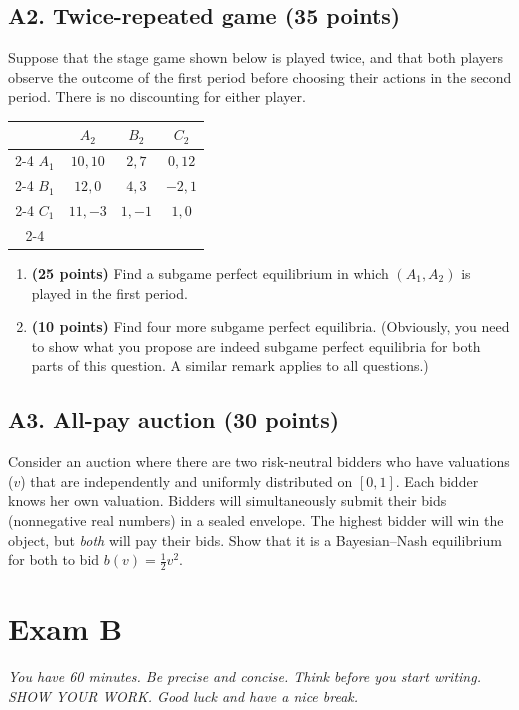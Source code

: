 \documentclass[11pt]{article}
\newcommand{\pts}[1]{\textbf{(#1 points)}}
\begin{document}
\subsection*{A2. Twice-repeated game \pts{35}}
Suppose that the stage game shown below is played twice, and that both players observe the outcome of the first period before choosing their actions in the second period. There is no discounting for either player.
\begin{center}
\begin{tabular}{c|c|c|c|}
  \multicolumn{1}{c}{} & \multicolumn{1}{c}{$A_2$} & \multicolumn{1}{c}{$B_2$} & \multicolumn{1}{c}{$C_2$} \\ \cline{2-4}
  $A_1$ & $10,10$ & $2,7$  & $0,12$ \\ \cline{2-4}
  $B_1$ & $12,0$  & $4,3$  & $-2,1$ \\ \cline{2-4}
  $C_1$ & $11,-3$ & $1,-1$ & $1,0$  \\ \cline{2-4}
\end{tabular}
\end{center}
\begin{enumerate}
  \item[(a)] \pts{25} Find a subgame perfect equilibrium in which $(A_1,A_2)$ is played in the first period.
  \item[(b)] \pts{10} Find four more subgame perfect equilibria. (Obviously, you need to show what you propose are indeed subgame perfect equilibria for both parts of this question. A similar remark applies to all questions.)
\end{enumerate}

\subsection*{A3. All-pay auction \pts{30}}
Consider an auction where there are two risk-neutral bidders who have valuations ($v$) that are independently and uniformly distributed on $[0,1]$. Each bidder knows her own valuation. Bidders will simultaneously submit their bids (nonnegative real numbers) in a sealed envelope. The highest bidder will win the object, but \emph{both} will pay their bids. Show that it is a Bayesian--Nash equilibrium for both to bid $b(v)=\tfrac12 v^2$.

\section*{Exam B}
\textit{You have 60 minutes. Be precise and concise. Think before you start writing. SHOW YOUR WORK. Good luck and have a nice break.}
\end{document}
